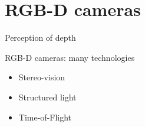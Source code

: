 \documentclass[compress]{beamer}
\begin{document}
\section{RGB-D cameras}

\begin{frame}{Perception of depth}
\end{frame}

\begin{frame}{RGB-D cameras: many technologies}
    \begin{itemize}
        \item Stereo-vision
        \item Structured light
        \item Time-of-Flight
    \end{itemize}
\end{frame}

\end{document}
